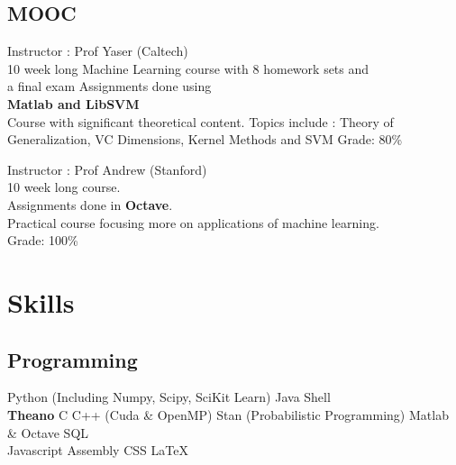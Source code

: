 \documentclass[]{deedy-resume}
\begin{document}
\begin{minipage}[t]{0.33\textwidth}
\subsection{MOOC}
\textbullet{} Instructor : Prof Yaser (Caltech)\\
\textbullet{} 10 week long Machine Learning course with 8 homework sets and \\a final exam
\textbullet{} Assignments done using \\ \textbf{Matlab and LibSVM}\\
\textbullet{} Course with significant theoretical content. Topics include : Theory of Generalization, VC Dimensions, Kernel Methods and SVM
\textbullet{} Grade: 80\%

\sectionsep
{}
\textbullet{} Instructor : Prof Andrew (Stanford)\\
\textbullet{} 10 week long course.\\
\textbullet{} Assignments done in \textbf{Octave}.\\
\textbullet{} Practical course focusing more on applications of machine learning.\\
\textbullet{} Grade: 100\%



\section{Skills}
\subsection{Programming}
Python (Including Numpy, Scipy, SciKit Learn) \textbullet{}   Java  \textbullet{} Shell \\
\sectionsep
{}
\textbullet{} \textbf{Theano} \textbullet{} C \textbullet{} C++ (Cuda \& OpenMP) \textbullet{} Stan (Probabilistic Programming) \textbullet{} Matlab \& Octave \textbullet{} SQL\\
\sectionsep
{}
Javascript \textbullet{} Assembly \textbullet{} CSS \textbullet{} \LaTeX\ \\

%
%

\end{minipage} 
\end{document}
